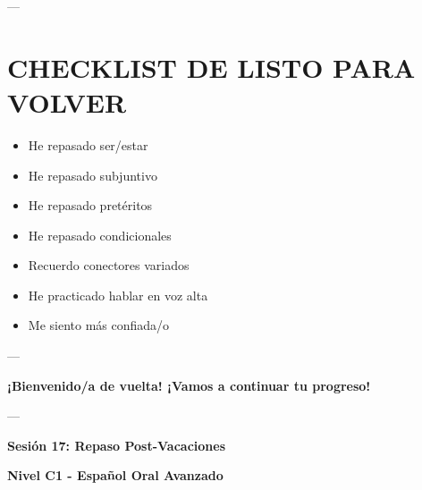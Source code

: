 \documentclass[a4paper,11pt]{article}
\begin{document}
\vspace{0.2cm}

---

\vspace{0.2cm}

\section{CHECKLIST DE LISTO PARA VOLVER}

\vspace{0.2cm}

\begin{itemize}

  \item [ ] He repasado ser/estar

  \item [ ] He repasado subjuntivo

  \item [ ] He repasado pretéritos

  \item [ ] He repasado condicionales

  \item [ ] Recuerdo conectores variados

  \item [ ] He practicado hablar en voz alta

  \item [ ] Me siento más confiada/o

\end{itemize}

\vspace{0.2cm}

---

\vspace{0.2cm}

\textbf{¡Bienvenido/a de vuelta! ¡Vamos a continuar tu progreso!}

\vspace{0.2cm}

---

\vspace{0.2cm}

\textbf{Sesión 17: Repaso Post-Vacaciones}

\textbf{Nivel C1 - Español Oral Avanzado}

\vspace{0.2cm}
\end{document}
